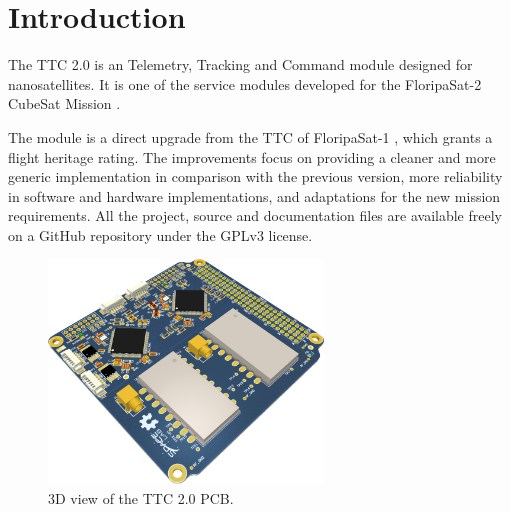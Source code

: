 %
%
%
%
%

%
%
%
%
%
%

\chapter{Introduction} \label{ch:introduction}

The TTC 2.0 is an Telemetry, Tracking and Command module designed for nanosatellites. It is one of the service modules developed for the FloripaSat-2 CubeSat Mission \cite{floripasat2}.

The module is a direct upgrade from the TTC of FloripaSat-1 \cite{ttc-fsat}, which grants a flight heritage rating. The improvements focus on providing a cleaner and more generic implementation in comparison with the previous version, more reliability in software and hardware implementations, and adaptations for the new mission requirements. All the project, source and documentation files are available freely on a GitHub repository \cite{ttc2-repo} under the GPLv3 license.

\begin{figure}[!h]
	\begin{center}
		\includegraphics[width=0.65\textwidth]{figures/ttc2_pcb_3d.png}
		\caption{3D view of the TTC 2.0 PCB.}
		\label{fig:pcb-3d}
	\end{center}
\end{figure}
